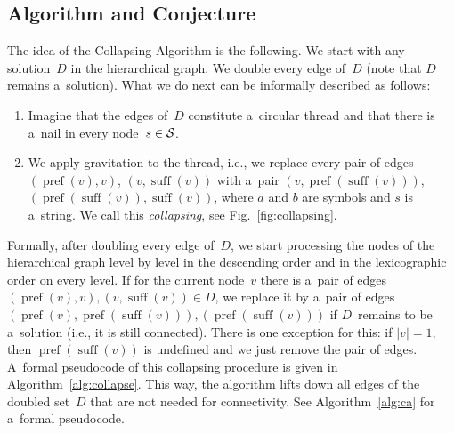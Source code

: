\documentclass[11pt]{article}
\DeclareMathOperator{\pref}{pref}
\DeclareMathOperator{\suff}{suff}
\begin{document}
\subsection{Algorithm and Conjecture}
\label{sec:alg_conj}
The idea of the Collapsing Algorithm is the following. 
We start with any solution~$D$ in the hierarchical graph. 
We double every edge of~$D$ (note that $D$ remains a~solution). What we do next can be informally described as follows:
\begin{enumerate}
\item Imagine that the edges of~$D$ constitute a~circular thread and that there is a~nail in every node~$s \in {\cal S}$.
\item We apply gravitation to the thread, i.e., we replace every pair of edges $(\pref(v), v)$, $(v, \suff(v))$ 
with a~pair $(v, \pref(\suff(v)))$, $(\pref(\suff(v)), \suff(v))$, where $a$ and $b$ are symbols and $s$ is a~string. We call this {\em collapsing}, see Fig.~\ref{fig:collapsing}.
\end{enumerate}
Formally, after doubling every edge of~$D$, we start processing the nodes of the hierarchical graph level by level in the descending order and in the lexicographic order on every level. If for the current node~$v$ there is a~pair of edges $(\pref(v), v), (v, \suff(v)) \in D$, we replace it by a~pair of edges $(\pref(v), \pref(\suff(v))), (\pref(\suff(v)))$ if $D$~remains to be a~solution (i.e., it is still connected). There is one exception for this: if $|v|=1$, then $\pref(\suff(v))$ is undefined and we just remove the pair of edges. 
A~formal pseudocode of this collapsing procedure is given in Algorithm~\ref{alg:collapse}. This way, the algorithm lifts down all edges of the doubled set~$D$ that are not needed for connectivity. See Algorithm~\ref{alg:ca} for a~formal pseudocode.
\end{document}
